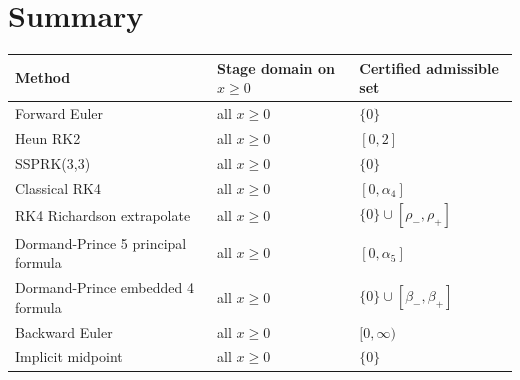 \section{Summary}
\begin{center}
\begin{tabularx}{\textwidth}{@{}X l l@{}}
\toprule
Method & Stage domain on $x\geq0$ & Certified admissible set \\
\midrule
Forward Euler & all $x\geq0$ & $\{0\}$ \\
Heun RK2 & all $x\geq0$ & $[0,2]$ \\
SSPRK(3,3) & all $x\geq0$ & $\{0\}$ \\
Classical RK4 & all $x\geq0$ & $[0,\alpha_4]$ \\
RK4 Richardson extrapolate & all $x\geq0$ & $\{0\}\cup[\rho_-,\rho_+]$ \\
Dormand-Prince 5 principal formula & all $x\geq0$ & $[0,\alpha_5]$ \\
Dormand-Prince embedded 4 formula & all $x\geq0$ & $\{0\}\cup[\beta_-,\beta_+]$ \\
Backward Euler & all $x\geq0$ & $[0,\infty)$ \\
Implicit midpoint & all $x\geq0$ & $\{0\}$ \\
\bottomrule
\end{tabularx}
\end{center}
